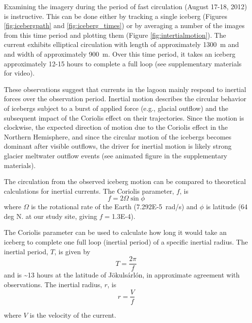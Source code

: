 Examining the imagery during the period of fast circulation (August 17-18, 2012) is instructive. This can be done either by tracking a single iceberg (Figures \ref{fig:icebergpath} and \ref{fig:iceberg_times}) or by averaging a number of the images from this time period and plotting them (Figure \ref{fig:intertialmotion}). The current exhibits elliptical circulation with length of approximately 1300~m and and width of approximately 900~m. Over this time period, it takes an iceberg approximately 12-15 hours to complete a full loop (see supplementary materials for video). 

These observations suggest that currents in the lagoon mainly respond to inertial forces over the observation period. Inertial motion describes the circular behavior of icebergs subject to a burst of applied force (e.g., glacial outflow) and the subsequent impact of the Coriolis effect on their trajectories. Since the motion is clockwise, the expected direction of motion due to the Coriolis effect in the Northern Hemisphere, and since the circular motion of the icebergs becomes dominant after visible outflows, the driver for inertial motion is likely strong glacier meltwater outflow events (see animated figure in the supplementary materials). 

The circulation from the observed iceberg motion can be compared to theoretical calculations for inertial currents.
The Coriolis parameter, $f$, is
\begin{equation}
f=2\Omega\sin\phi
\end{equation} where $\Omega$ is the rotational rate of the Earth (7.292E-5~rad/s) and $\phi$ is latitude (64 deg N. at our study site, giving $f=$1.3E-4).

The Coriolis parameter can be used to calculate how long it would take an iceberg to complete one full loop (inertial period) of a specific inertial radius.
The inertial period, $T$, is given by  
\begin{equation}
 T=\frac{2\pi}{f}
\end{equation}
and is \textasciitilde13 hours at the latitude of Jökulsárlón, in approximate agreement with observations.
The inertial radius, $r$, is
\begin{equation}
r=\frac{V}{f}
\end{equation}

where $V$ is the velocity of the current.


